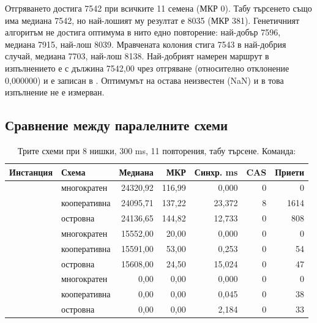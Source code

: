 Отгряването достига 7542 при всичките 11 семена (МКР 0). Табу търсенето също има медиана 7542, но
най-лошият му резултат е 8035 (МКР 381). Генетичният алгоритъм не достига оптимума в нито едно
повторение: най-добър 7596, медиана 7915, най-лош 8039. Мравчената колония стига 7543 в най-добрия
случай, медиана 7703, най-лош 8138. Най-добрият намерен маршрут в изпълнението е с дължина 7542,00
чрез отгряване (относително отклонение 0,000000) и е записан в
. Оптимумът на  остава неизвестен
(NaN) и в това изпълнение не е измерван.

\subsection{Сравнение между паралелните схеми}
\label{subsec:res-cooperation}

\begin{table}[htbp]
\centering
\renewcommand{\arraystretch}{0.9}
\caption{Трите схеми при 8 нишки, 300 ms, 11 повторения, табу търсене. Команда: }
\label{tab:schemes}
\begin{adjustbox}{max width=\textwidth}
\begin{tabular}{@{}L{3.3cm}L{2.4cm}rrrrr@{}}
\toprule
\textbf{Инстанция} & \textbf{Схема} & \textbf{Медиана} & \textbf{МКР} & \textbf{Синхр. ms} & \textbf{CAS} & \textbf{Приети} \\
\midrule
{} & многократен  & 24320,92 & 116,99 & 0,000  & 0 & 0 \\
 & кооперативна & 24095,71 & 137,22 & 23,372 & 8 & 1614 \\
 & островна     & 24136,65 & 144,82 & 12,733 & 0 & 808 \\
\midrule
{} & многократен  & 15552,00 & 20,00 & 0,000  & 0 & 0 \\
 & кооперативна & 15591,00 & 53,00 & 0,253  & 0 & 54 \\
 & островна     & 15608,00 & 24,50 & 15,024 & 0 & 47 \\
\midrule
{} & многократен  & 0,00 & 0,00 & 0,000 & 0 & 0 \\
 & кооперативна & 0,00 & 0,00 & 0,045 & 0 & 38 \\
 & островна     & 0,00 & 0,00 & 2,184 & 0 & 33 \\
\bottomrule
\end{tabular}
\end{adjustbox}
\end{table}

